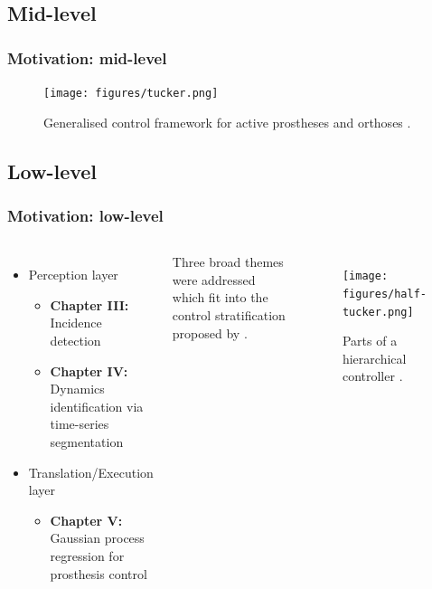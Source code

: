 \documentclass[aspectratio=169]{beamer}
\begin{document}


\begin{frame}[plain]
    \subsection{Mid-level}
    \frametitle{Motivation: mid-level}
    \begin{figure}
        \centering
        \texttt{[image: figures/tucker.png]}
        \caption{Generalised control framework for active prostheses and orthoses \citep{tucker2015control}.}
    \end{figure}
\end{frame}


\begin{frame}
    \subsection{Low-level}
    \frametitle{Motivation: low-level}
    \begin{columns}[t] %
        \begin{itemize}
            \item Perception layer 
                \begin{itemize}
                    \item {\bf Chapter III:} Incidence detection 
                    \item {\bf Chapter IV:} Dynamics identification via time-series segmentation
                \end{itemize}
            \item Translation/Execution layer 
                \begin{itemize}
                    \item {\bf Chapter V:} Gaussian process regression for prosthesis control 
                \end{itemize}
        \end{itemize}

        Three broad themes were addressed which fit into the control stratification proposed by
        \citet{tucker2015control}.

        \begin{figure}[ht]
            \centering
            \texttt{[image: figures/half-tucker.png]}
            \caption{Parts of a hierarchical controller \citep{tucker2015control}.}
        \end{figure}
    \end{columns}
\end{frame}
\end{document}
